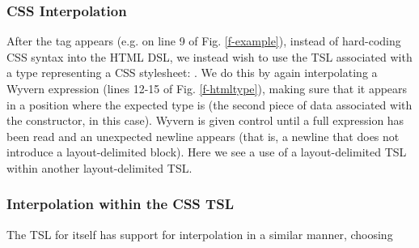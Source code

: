 {\subsubsection{CSS Interpolation} After the  tag appears (e.g. on line 9 of Fig. \ref{f-example}), instead of hard-coding CSS syntax into the HTML DSL, we instead wish to use the TSL associated with a type representing a CSS stylesheet: . We do this by again interpolating a Wyvern expression (lines 12-15 of Fig. \ref{f-htmltype}), making sure that it appears in a position where the expected type is  (the second piece of data associated with the  constructor, in this case). Wyvern is given control until a full expression has been read and an unexpected newline appears (that is, a newline that does not introduce a layout-delimited block). Here we see a use of a layout-delimited TSL within another layout-delimited TSL.

\subsubsection{Interpolation within the CSS TSL} The TSL for  itself has support for interpolation in a similar manner, choosing \li{%
In this case, we emphasize that TSLs produced structured values by calling the \li{darken} method on it to produce a new color. This method itself takes a \li{Percentage} as an argument. The TSL for this type accepts literal bodies containing numbers followed by \li{pct}, or simply a real number without a suffix. Numeric literals, because they begin with a number (and no other form in Wyvern can), do not require delimiters (Fig. \ref{f-delims}). 

\subsubsection{Interpolation within the SQLQuery TSL} The TSL used for SQL queries on line 18 of Fig. \ref{f-example} follows an identical pattern, allowing strings to be interpolated into portions of a query in a safe manner. This prevents SQL injection attacks from occurring while maintaining standard SQL syntax.

}}
